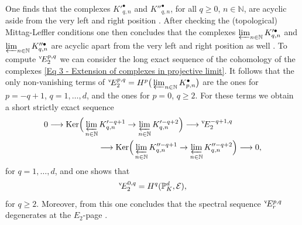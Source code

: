 \documentclass[a4paper, reqno, 10pt]{amsart}
\theoremstyle{definition}
\numberwithin{equation}{section}
\newcommand{\Ker}{{\mathrm{Ker}}}
\newcommand{\lra}{\longrightarrow}
\newcommand{\ra}{\rightarrow}
\newcommand{\BN}{{\mathbb {N}}}
\newcommand{\BP}{{\mathbb {P}}}
\newcommand{\CE}{{\mathcal {E}}}
\begin{document}
One finds that the complexes $K'^{\bullet}_{q,n}$ and $K''^{\bullet}_{q,n}$, for all $q\geq 0$, $n \in \BN$, are acyclic aside from the very left and right position \cite[Lemma 2.2.5]{Orlik08EquivVBDrinfeldUpHalfSp}.
After checking the (topological) Mittag-Leffler conditions one then concludes that the complexes $\varprojlim_{n\in \BN} K'^{\bullet}_{q,n}$ and $\varprojlim_{n\in \BN} K''^{\bullet}_{q,n}$ are acyclic apart from the very left and right position as well \cite[Rmk.\ 2.2.6]{Orlik08EquivVBDrinfeldUpHalfSp}.
To compute $^{\rm v}\! E_2^{p,q}$ we can consider the long exact sequence of the cohomology of the complexes \eqref{Eq 3 - Extension of complexes in projective limit}.
It follows that the only non-vanishing terms of $^{\rm v}\! E_2^{p,q} = H^p \big(\varprojlim_{n\in\BN} K^{\bullet}_{p,n}\big)$ are the ones for $p=-q+1$, $q=1,\ldots,d$, and the ones for $p=0$, $q \geq 2$.
For these terms we obtain a short strictly exact sequence
\begin{equation}\label{Eq 3 - Extension for terms of E_2-page}
	\begin{aligned}
		0 \lra \Ker\Big( \varprojlim_{n\in \BN}  &{\hspace{1.5pt}} K'^{ -q+1}_{q,n} \ra \varprojlim_{n\in \BN} K'^{-q+2}_{q,n} \Big) \lra {}^{\rm v}\! E_2^{-q+1,q} \\
		&\lra \Ker\Big( \varprojlim_{n\in \BN} K''^{ -q+1}_{q,n} \ra \varprojlim_{n\in \BN} K''^{-q+2}_{q,n} \Big) \lra 0 ,
	\end{aligned}
\end{equation}
for $q=1,\ldots,d$, and one shows that
\begin{equation*}
	{}^{\rm v}\! E_2^{0,q} = H^q(\BP_K^d, \CE) ,
\end{equation*}
for $q \geq 2 $.
Moreover, from this one concludes that the spectral sequence $^{\rm v}\! E_r^{p,q} $ degenerates at the $E_2$-page \cite[p.\ 633]{Orlik08EquivVBDrinfeldUpHalfSp}.
\end{document}
